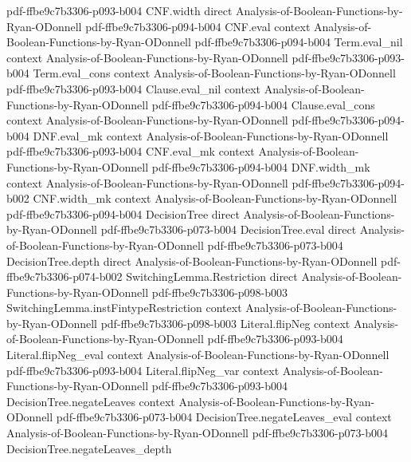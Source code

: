 \begin{theorem}
  {pdf-ffbe9c7b3306-p093-b004}
\proofstep
  {CNF.width}
  {direct}
  {Analysis-of-Boolean-Functions-by-Ryan-ODonnell}
  {pdf-ffbe9c7b3306-p094-b004}
\proofstep
  {CNF.eval}
  {context}
  {Analysis-of-Boolean-Functions-by-Ryan-ODonnell}
  {pdf-ffbe9c7b3306-p094-b004}
\proofstep
  {Term.eval_nil}
  {context}
  {Analysis-of-Boolean-Functions-by-Ryan-ODonnell}
  {pdf-ffbe9c7b3306-p093-b004}
\proofstep
  {Term.eval_cons}
  {context}
  {Analysis-of-Boolean-Functions-by-Ryan-ODonnell}
  {pdf-ffbe9c7b3306-p093-b004}
\proofstep
  {Clause.eval_nil}
  {context}
  {Analysis-of-Boolean-Functions-by-Ryan-ODonnell}
  {pdf-ffbe9c7b3306-p094-b004}
\proofstep
  {Clause.eval_cons}
  {context}
  {Analysis-of-Boolean-Functions-by-Ryan-ODonnell}
  {pdf-ffbe9c7b3306-p094-b004}
\proofstep
  {DNF.eval_mk}
  {context}
  {Analysis-of-Boolean-Functions-by-Ryan-ODonnell}
  {pdf-ffbe9c7b3306-p093-b004}
\proofstep
  {CNF.eval_mk}
  {context}
  {Analysis-of-Boolean-Functions-by-Ryan-ODonnell}
  {pdf-ffbe9c7b3306-p094-b004}
\proofstep
  {DNF.width_mk}
  {context}
  {Analysis-of-Boolean-Functions-by-Ryan-ODonnell}
  {pdf-ffbe9c7b3306-p094-b002}
\proofstep
  {CNF.width_mk}
  {context}
  {Analysis-of-Boolean-Functions-by-Ryan-ODonnell}
  {pdf-ffbe9c7b3306-p094-b004}
\proofstep
  {DecisionTree}
  {direct}
  {Analysis-of-Boolean-Functions-by-Ryan-ODonnell}
  {pdf-ffbe9c7b3306-p073-b004}
\proofstep
  {DecisionTree.eval}
  {direct}
  {Analysis-of-Boolean-Functions-by-Ryan-ODonnell}
  {pdf-ffbe9c7b3306-p073-b004}
\proofstep
  {DecisionTree.depth}
  {direct}
  {Analysis-of-Boolean-Functions-by-Ryan-ODonnell}
  {pdf-ffbe9c7b3306-p074-b002}
\proofstep
  {SwitchingLemma.Restriction}
  {direct}
  {Analysis-of-Boolean-Functions-by-Ryan-ODonnell}
  {pdf-ffbe9c7b3306-p098-b003}
\proofstep
  {SwitchingLemma.instFintypeRestriction}
  {context}
  {Analysis-of-Boolean-Functions-by-Ryan-ODonnell}
  {pdf-ffbe9c7b3306-p098-b003}
\proofstep
  {Literal.flipNeg}
  {context}
  {Analysis-of-Boolean-Functions-by-Ryan-ODonnell}
  {pdf-ffbe9c7b3306-p093-b004}
\proofstep
  {Literal.flipNeg_eval}
  {context}
  {Analysis-of-Boolean-Functions-by-Ryan-ODonnell}
  {pdf-ffbe9c7b3306-p093-b004}
\proofstep
  {Literal.flipNeg_var}
  {context}
  {Analysis-of-Boolean-Functions-by-Ryan-ODonnell}
  {pdf-ffbe9c7b3306-p093-b004}
\proofstep
  {DecisionTree.negateLeaves}
  {context}
  {Analysis-of-Boolean-Functions-by-Ryan-ODonnell}
  {pdf-ffbe9c7b3306-p073-b004}
\proofstep
  {DecisionTree.negateLeaves_eval}
  {context}
  {Analysis-of-Boolean-Functions-by-Ryan-ODonnell}
  {pdf-ffbe9c7b3306-p073-b004}
\proofstep
  {DecisionTree.negateLeaves_depth}

\end{theorem}
